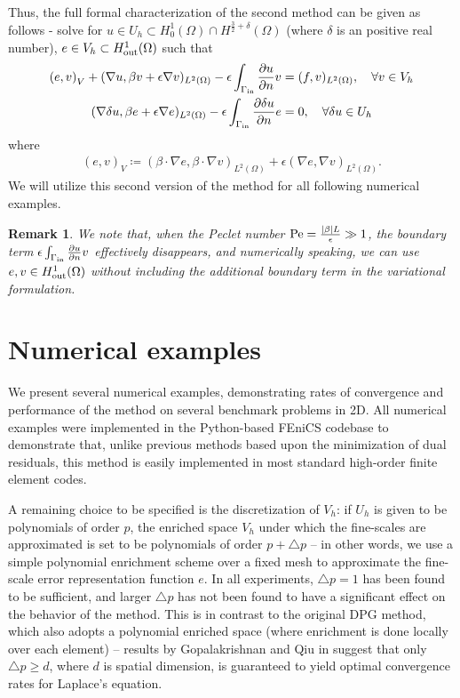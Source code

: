\documentclass[final,leqno]{siamltex}
\newcommand{\LRp}[1]{\left( #1 \right)}
\newcommand{\LRc}[1]{\left\{ #1 \right\}}
\newcommand{\LRb}[1]{\left| #1 \right|}
\newcommand{\Grad} {\ensuremath{\nabla}}
\renewcommand{\L}{L^2\LRp{\Omega}}
\newcommand{\pd}[2]{\frac{\partial#1}{\partial#2}}
\newtheorem{remark}{Remark}
\begin{document}
Thus, the full formal characterization of the second method can be given as follows - solve for $u\in U_h \subset H^1_0(\Omega)\cap H^{\frac{3}{2}+\delta}(\Omega)$ (where $\delta$ is an positive real number), $e\in V_h\subset H^1_{\rm out}(\Omega)$ such that
\begin{align*}
\LRp{e,v}_V + (\Grad u, \beta v + \epsilon \Grad v)_{\L} - \epsilon\int_{\Gamma_{\rm in}} \pd{u}{n}v &= (f,v)_{\L}, \quad \forall v \in V_h\\
(\Grad \delta u, \beta e + \epsilon \Grad e)_{\L} - \epsilon\int_{\Gamma_{\rm in}} \pd{\delta u}{n}e &= 0, \quad \forall \delta u \in U_h
\end{align*}
where
\begin{align*}
\LRp{e,v}_V \coloneqq \LRp{\beta\cdot \Grad e,\beta\cdot \Grad v}_{\L} + \epsilon \LRp{\Grad e,\Grad v}_{\L}.
\end{align*}
We will utilize this second version of the method for all following numerical examples.  


\begin{remark}
We note that, when the Peclet number ${\rm Pe} = \frac{\LRb{\beta} L}{\epsilon} \gg 1$, the boundary term $\epsilon\int_{\Gamma_{\rm in}} \pd{u}{n}v$ effectively disappears, and numerically speaking, we can use $e,v\in H^1_{\rm out}(\Omega)$ without including the additional boundary term in the variational formulation.  
\end{remark}

\section{Numerical examples}

We present several numerical examples, demonstrating rates of convergence and performance of the method on several benchmark problems in 2D.  All numerical examples were implemented in the Python-based FEniCS codebase \cite{LoggMardalEtAl2012a} to demonstrate that, unlike previous methods based upon the minimization of dual residuals, this method is easily implemented in most standard high-order finite element codes.  

A remaining choice to be specified is the discretization of $V_h$: if $U_h$ is given to be polynomials of order $p$, the enriched space $V_h$ under which the fine-scales are approximated is set to be polynomials of order $p+\triangle p$ -- in other words, we use a simple polynomial enrichment scheme over a fixed mesh to approximate the fine-scale error representation function $e$.  In all experiments, $\triangle p = 1$ has been found to be sufficient, and larger $\triangle p$ has not been found to have a significant effect on the behavior of the method.  This is in contrast to the original DPG method, which also adopts a polynomial enriched space (where enrichment is done locally over each element) -- results by Gopalakrishnan and Qiu in \cite{practicalDPG} suggest that only $\triangle p \geq d$, where $d$ is spatial dimension, is guaranteed to yield optimal convergence rates for Laplace's equation.  
\end{document}
